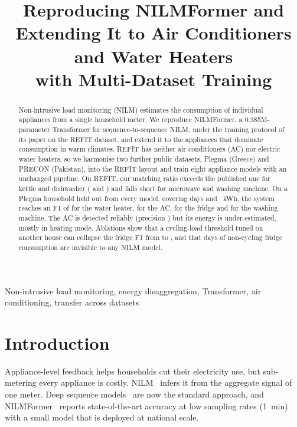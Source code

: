 \documentclass[conference]{IEEEtran}
\begin{document}
\title{Reproducing NILMFormer and Extending It to Air Conditioners and Water Heaters\\with Multi-Dataset Training}

\author{\IEEEauthorblockN{[Authors]}
\IEEEauthorblockA{{[Affiliation]} \\ {[email]}}}

\maketitle

\begin{abstract}
Non-intrusive load monitoring (NILM) estimates the consumption of individual appliances from a
single household meter. We reproduce NILMFormer, a 0.385M-parameter Transformer for
sequence-to-sequence NILM, under the training protocol of its paper on the REFIT dataset, and
extend it to the appliances that dominate consumption in warm climates. REFIT has neither air
conditioners (AC) nor electric water heaters, so we harmonise two further public datasets, Plegma
(Greece) and PRECON (Pakistan), into the REFIT layout and train eight appliance models with an
unchanged pipeline. On REFIT, our matching ratio exceeds the published one for kettle and
dishwasher (\KettleMR{} and \DWMR{}) and falls short for microwave and washing machine. On a
Plegma household held out from every model, covering \HouseDays{} days and \HouseKWh{}~kWh, the
system reaches an F1 of \WHFone{} for the water heater, \ACFone{} for the AC, \FridgeFone{} for
the fridge and \WMFone{} for the washing machine. The AC is detected reliably (precision
\ACPrec{}) but its energy is under-estimated, mostly in heating mode. Ablations show that a
cycling-load threshold tuned on another house can collapse the fridge F1 from \FridgeThrFixedFone{}
to \FridgeThrTunedFone{}, and that \FridgeConstDays{} days of non-cycling fridge consumption are
invisible to any NILM model.
\end{abstract}

\begin{IEEEkeywords}
Non-intrusive load monitoring, energy disaggregation, Transformer, air conditioning, transfer across datasets
\end{IEEEkeywords}

\section{Introduction}
Appliance-level feedback helps households cut their electricity use, but sub-metering every
appliance is costly. NILM~\cite{hart1992nilm} infers it from the aggregate signal of one meter.
Deep sequence models~\cite{kelly2015neuralnilm,zhang2018seq2point,yue2020bert4nilm} are now the
standard approach, and NILMFormer~\cite{petralia2025nilmformer} reports state-of-the-art accuracy
at low sampling rates (1~min) with a small model that is deployed at national scale.
\end{document}

